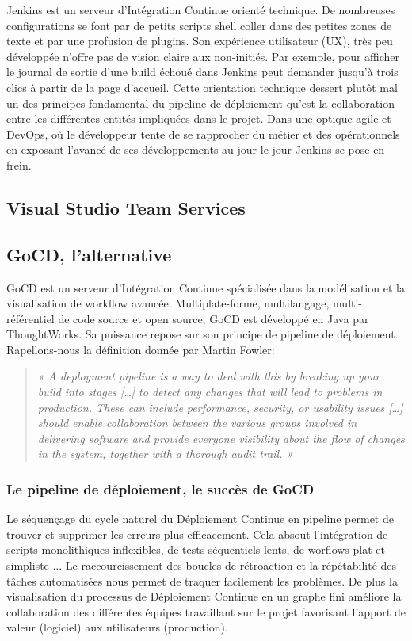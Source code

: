     Jenkins est un serveur d’Intégration Continue orienté technique. De nombreuses configurations se font par de petits scripts shell coller dans des petites zones de texte et par une profusion de plugins. Son expérience utilisateur (UX), très peu développée n’offre pas de vision claire aux non-initiés. Par exemple, pour afficher le journal de sortie d’une build échoué dans Jenkins peut demander jusqu’à trois clics à partir de la page d’accueil. Cette orientation technique dessert plutôt mal un des principes fondamental du pipeline de déploiement qu’est la collaboration entre les différentes entités impliquées dans le projet. Dans une optique agile et DevOps, où le développeur tente de se rapprocher du métier et des opérationnels en exposant l’avancé de ses développements au jour le jour Jenkins se pose en frein.\\

    \subsection{Visual Studio Team Services}

    \subsection{GoCD, l'alternative}
    GoCD est un serveur d'Intégration Continue spécialisée dans la modélisation et la visualisation de workflow avancée. Multiplate-forme, multilangage, multi-référentiel de code source et open source, GoCD est développé en Java par ThoughtWorks. Sa puissance repose sur son principe de pipeline de déploiement. Rapellons-nous la définition donnée par Martin Fowler:\\

    \begin{quotation}
      \emph{« A deployment pipeline is a way to deal with this by breaking up your build into stages […] to detect any changes that will lead to problems in production. These can include performance, security, or usability issues […] should enable collaboration between the various groups involved in delivering software and provide everyone visibility about the flow of changes in the system, together with a thorough audit trail. »}
    \end{quotation}

    \subsubsection{Le pipeline de déploiement, le succès de GoCD}
    Le séquençage du cycle naturel du Déploiement Continue en pipeline permet de trouver et supprimer les erreurs plus efficacement. Cela absout l'intégration de scripts monolithiques inflexibles, de tests séquentiels lents, de worflows plat et simpliste ... Le raccourcissement des boucles de rétroaction et la répétabilité des tâches automatisées nous permet de traquer facilement les problèmes. De plus la visualisation du processus de Déploiement Continue en un graphe fini améliore la collaboration des différentes équipes travaillant sur le projet favorisant l'apport de valeur (logiciel) aux utilisateurs (production).\\

